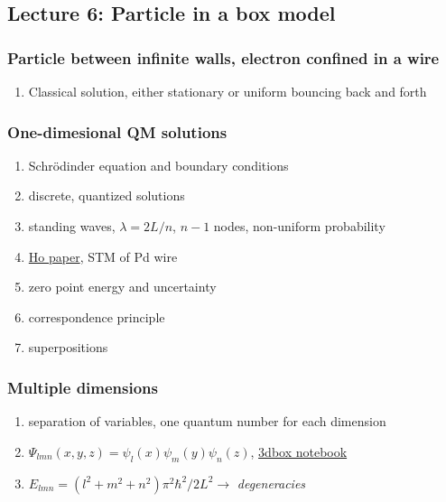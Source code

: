 \documentclass[11pt]{article}
\begin{document}
\subsection{Lecture 6: Particle in a box model}
\label{sec:org3d969d7}
\subsubsection{Particle between infinite walls, electron confined in a wire}
\label{sec:orgd89c859}
\begin{enumerate}
\item Classical solution, either stationary or uniform bouncing back and forth
\end{enumerate}
\subsubsection{One-dimesional QM solutions}
\label{sec:org2af38d0}
\begin{enumerate}
\item Schr\"{o}dinder equation and boundary conditions
\item discrete, quantized solutions
\item standing waves, \(\lambda=2 L/n\), \(n-1\) nodes, non-uniform probability
\item \href{http://dx.doi.org/10.1021/jp053496l}{Ho paper}, STM of Pd wire
\item zero point energy and uncertainty
\item correspondence principle
\item superpositions
\end{enumerate}
\subsubsection{Multiple dimensions}
\label{sec:org2f82916}
\begin{enumerate}
\item separation of variables, one quantum number for each dimension
\item \(\Psi_{lmn}(x,y,z) = \psi_l(x) \psi_m(y) \psi_n(z)\), \href{https://colab.research.google.com/github/wmfschneider/CHE30324/blob/master/Resources/3dbox.ipynb}{3dbox notebook}
\item \(E_{lmn}=(l^2+m^2+n^2)\pi^2\hbar^2/2L^2 \longrightarrow\) \emph{degeneracies}
\end{enumerate}
\end{document}
